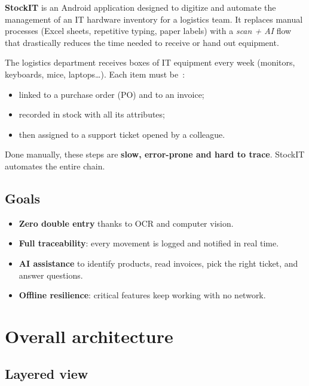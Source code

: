\documentclass[11pt,a4paper]{article}
\begin{document}
\textbf{StockIT} is an Android application designed to digitize and
automate the management of an IT hardware inventory for a logistics
team. It replaces manual processes (Excel sheets, repetitive typing,
paper labels) with a \emph{scan + AI} flow that drastically reduces
the time needed to receive or hand out equipment.

\begin{infobox}
The logistics department receives boxes of IT equipment every week
(monitors, keyboards, mice, laptops\dots). Each item must be~:
\begin{itemize}
  \item linked to a purchase order (PO) and to an invoice;
  \item recorded in stock with all its attributes;
  \item then assigned to a support ticket opened by a colleague.
\end{itemize}
Done manually, these steps are \textbf{slow, error-prone and hard
to trace}. StockIT automates the entire chain.
\end{infobox}

\subsection{Goals}
\begin{itemize}
  \item \textbf{Zero double entry} thanks to OCR and computer vision.
  \item \textbf{Full traceability}: every movement is logged and
        notified in real time.
  \item \textbf{AI assistance} to identify products, read invoices,
        pick the right ticket, and answer questions.
  \item \textbf{Offline resilience}: critical features keep working
        with no network.
\end{itemize}

\section{Overall architecture}

\subsection{Layered view}
\end{document}
